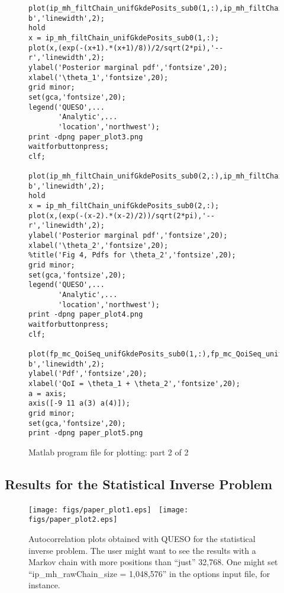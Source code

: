 \begin{figure}[h!]
\begin{center}
\begin{verbatim}
plot(ip_mh_filtChain_unifGkdePosits_sub0(1,:),ip_mh_filtChain_unifGkdeValues_sub0(1,:),'-b','linewidth',2);
hold
x = ip_mh_filtChain_unifGkdePosits_sub0(1,:);
plot(x,(exp(-(x+1).*(x+1)/8))/2/sqrt(2*pi),'--r','linewidth',2);
ylabel('Posterior marginal pdf','fontsize',20);
xlabel('\theta_1','fontsize',20);
grid minor;
set(gca,'fontsize',20);
legend('QUESO',...
       'Analytic',...
       'location','northwest');
print -dpng paper_plot3.png
waitforbuttonpress;
clf;

plot(ip_mh_filtChain_unifGkdePosits_sub0(2,:),ip_mh_filtChain_unifGkdeValues_sub0(2,:),'-b','linewidth',2);
hold
x = ip_mh_filtChain_unifGkdePosits_sub0(2,:);
plot(x,(exp(-(x-2).*(x-2)/2))/sqrt(2*pi),'--r','linewidth',2);
ylabel('Posterior marginal pdf','fontsize',20);
xlabel('\theta_2','fontsize',20);
%title('Fig 4, Pdfs for \theta_2','fontsize',20);
grid minor;
set(gca,'fontsize',20);
legend('QUESO',...
       'Analytic',...
       'location','northwest');
print -dpng paper_plot4.png
waitforbuttonpress;
clf;

plot(fp_mc_QoiSeq_unifGkdePosits_sub0(1,:),fp_mc_QoiSeq_unifGkdeValues_sub0(1,:),'-b','linewidth',2);
ylabel('Pdf','fontsize',20);
xlabel('QoI = \theta_1 + \theta_2','fontsize',20);
a = axis;
axis([-9 11 a(3) a(4)]);
grid minor;
set(gca,'fontsize',20);
print -dpng paper_plot5.png
\end{verbatim}
\end{center}
\caption{
Matlab program file for plotting: part 2 of 2
}
\label{fig-plots-2}
\end{figure}

\subsection{Results for the Statistical Inverse Problem}

\begin{figure}[h!]
\centerline{
\texttt{[image: figs/paper\_plot1.eps]}
$~$
\texttt{[image: figs/paper\_plot2.eps]}
}
\caption{
Autocorrelation plots obtained with QUESO for the statistical inverse problem.
The user might want to see the results with a Markov chain with more positions than ``just'' 32,768. One might set ``ip\_mh\_rawChain\_size = 1,048,576'' in the options input file, for instance.
}
\label{fig-sip-autocorr-plots}
\end{figure}

